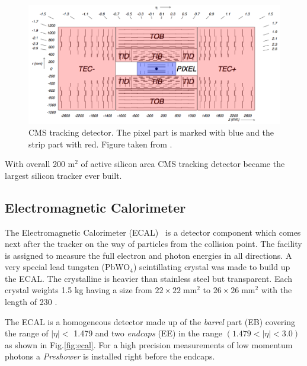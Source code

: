 \begin{figure}[t]
  \centering
  \includegraphics[width=1.1\textwidth]{02_experimental_setup/plots/img_cms_tracker_view.png}
  \caption{CMS tracking detector. The pixel part is marked with blue and the strip part with red. Figure taken from \cite{Lenzi:2013xpa}.}
  \label{fig:tracker}
\end{figure}

With overall 200 m$^2$ of active silicon area CMS tracking detector became the largest silicon tracker ever built. 

\subsection{Electromagnetic Calorimeter}

The Electromagnetic Calorimeter (ECAL)~\cite{ECALtdr, ECALtdradd, CMSatLHC} is a detector component which comes next after the tracker on the way of particles from
the collision point. The facility is assigned to measure the full electron and photon energies in all directions. 
A very special lead tungsten (PbWO$_{4}$) scintillating crystal was made to build up the ECAL. The crystalline is heavier than stainless steel but transparent. 
Each crystal weights 1.5 kg having a size from $22\times22\;$mm$^2$ to $26\times26\;$mm$^2$ with the length of 230 .

The ECAL is a homogeneous detector made up of the \textit{barrel} part (EB) covering the range of $|\eta| <$ 1.479 and two \textit{endcaps} (EE) in the range $(1.479 < |\eta| < 3.0)$
as shown in Fig.\ref{fig:ecal}. For a high precision measurements of low momentum photons a \textit{Preshower} is installed right before 
the endcaps.

